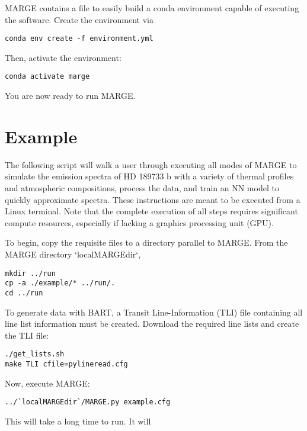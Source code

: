 \documentclass[letterpaper, 12pt]{article}
\begin{document}
\noindent MARGE contains a file to easily build a conda environment capable of 
executing the software.  Create the environment via

\begin{verbatim}
conda env create -f environment.yml
\end{verbatim}

\noindent Then, activate the environment:

\begin{verbatim}
conda activate marge
\end{verbatim}

\noindent You are now ready to run MARGE.


\section{Example}
\label{sec:example}

\noindent The following script will walk a user through executing all modes of MARGE 
to simulate the emission spectra of HD 189733 b with a variety of thermal 
profiles and atmospheric compositions, process the data, and train an NN 
model to quickly approximate spectra.  These instructions are meant to be 
executed from a Linux terminal.  Note that the complete execution of all steps 
requires significant compute resources, especially if lacking a graphics 
processing unit (GPU).

\noindent To begin, copy the requisite files to a directory parallel to MARGE.  From 
the MARGE directory `localMARGEdir`,

\begin{verbatim}
mkdir ../run
cp -a ./example/* ../run/.
cd ../run
\end{verbatim}

\noindent To generate data with BART, a Transit Line-Information (TLI) file containing 
all line list information must be created.  Download the required line lists 
and create the TLI file:

\begin{verbatim}
./get_lists.sh
make TLI cfile=pylineread.cfg
\end{verbatim}

\noindent Now, execute MARGE:

\begin{verbatim}
../`localMARGEdir`/MARGE.py example.cfg
\end{verbatim}

\noindent This will take a long time to run.  It will 
\end{document}
